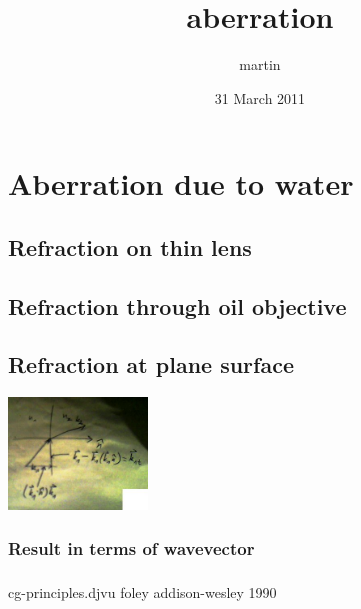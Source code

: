 \documentclass[11pt]{article}
\title{aberration}
\author{martin}
\date{31 March 2011}
\begin{document}
\maketitle

\setcounter{tocdepth}{3}
\tableofcontents
\vspace*{1cm}
\section{Aberration due to water}
\label{sec-1}

\subsection{Refraction on thin lens}
\label{sec-1.1}
\subsection{Refraction through oil objective}
\label{sec-1.2}

\subsection{Refraction at plane surface}
\label{sec-1.3}

   \includegraphics[width=10em]{./slab.jpg}

   
\subsubsection{Result in terms of wavevector}
\label{sec-1.3.1}

 

\subsubsection{}
cg-principles.djvu foley addison-wesley 1990
 \begin{figure} 
   \centering
   
 \end{figure}
\end{document}
